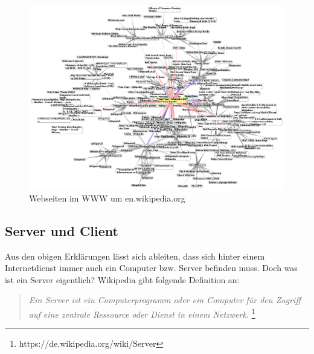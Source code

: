 \begin{figure}[h]
\centering
\includegraphics[scale=0.4]{images/wikipedia_www}
\caption{Webseiten im WWW um en.wikipedia.org}
\end{figure}

\newpage
\subsection{Server und Client}
Aus den obigen Erklärungen lässt sich ableiten, dass sich hinter einem Internetdienst immer auch ein Computer bzw. Server befinden muss.
Doch was ist ein Server eigentlich? Wikipedia gibt folgende Definition an:

\begin{quote}
\textit{Ein Server ist ein Computerprogramm oder ein Computer für den Zugriff auf eine zentrale Ressource oder Dienst in einem Netzwerk.}
\footnote{https://de.wikipedia.org/wiki/Server}
\end{quote}

